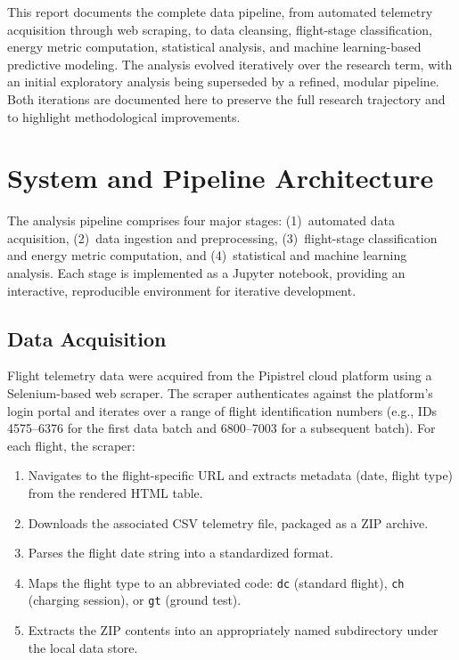 \documentclass[11pt,a4paper]{article}
\begin{document}
This report documents the complete data pipeline, from automated telemetry acquisition through web scraping, to data cleansing, flight-stage classification, energy metric computation, statistical analysis, and machine learning-based predictive modeling.
The analysis evolved iteratively over the research term, with an initial exploratory analysis being superseded by a refined, modular pipeline.
Both iterations are documented here to preserve the full research trajectory and to highlight methodological improvements.

\section{System and Pipeline Architecture}

The analysis pipeline comprises four major stages: (1)~automated data acquisition, (2)~data ingestion and preprocessing, (3)~flight-stage classification and energy metric computation, and (4)~statistical and machine learning analysis.
Each stage is implemented as a Jupyter notebook, providing an interactive, reproducible environment for iterative development.

\subsection{Data Acquisition}

Flight telemetry data were acquired from the Pipistrel cloud platform using a Selenium-based web scraper.
The scraper authenticates against the platform's login portal and iterates over a range of flight identification numbers (e.g., IDs 4575--6376 for the first data batch and 6800--7003 for a subsequent batch).
For each flight, the scraper:

\begin{enumerate}
    \item Navigates to the flight-specific URL and extracts metadata (date, flight type) from the rendered HTML table.
    \item Downloads the associated CSV telemetry file, packaged as a ZIP archive.
    \item Parses the flight date string into a standardized format.
    \item Maps the flight type to an abbreviated code: \texttt{dc} (standard flight), \texttt{ch} (charging session), or \texttt{gt} (ground test).
    \item Extracts the ZIP contents into an appropriately named subdirectory under the local data store.
\end{enumerate}
\end{document}
